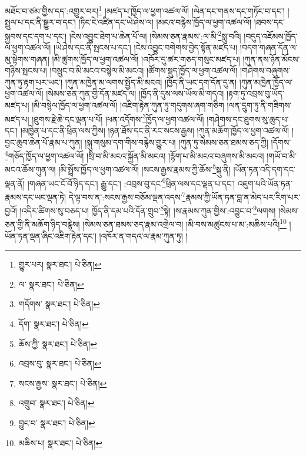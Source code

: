 མཐོང་བ་ཙམ་གྱིས་དད་:འགྱུར་བར།\footnote{གྱུར་པར།  སྣར་ཐང་།  པེ་ཅིན། } །མཛད་པ་ཁྱོད་ལ་ཕྱག་འཚལ་ལོ། །ལེན་དང་གནས་དང་གཏོང་བ་དང་། །སྤྲུལ་པ་དང་ནི་སྒྱུར་བ་དང་། །ཏིང་ངེ་འཛིན་དང་ཡེ་ཤེས་ལ། །མངའ་བརྙེས་ཁྱོད་ལ་ཕྱག་འཚལ་ལོ། །ཐབས་དང་སྐྱབས་དང་དག་པ་དང་། །ངེས་འབྱུང་ཐེག་པ་ཆེན་པོ་ལ། །སེམས་ཅན་རྣམས་:ལ་མི་\footnote{ལ་  སྣར་ཐང་།  པེ་ཅིན། }སླུ་བའི། །བདུད་འཇོམས་ཁྱོད་ལ་ཕྱག་འཚལ་ལོ། །ཡེ་ཤེས་དང་ནི་སྤངས་པ་དང་། །ངེས་འབྱུང་བགེགས་བྱེད་སྟོན་མཛད་པ། །བདག་གཞན་དོན་ལ་མུ་སྟེགས་གཞན། །མི་ཚུགས་ཁྱོད་ལ་ཕྱག་འཚལ་ལོ། །འཁོར་དུ་ཚར་གཅད་གསུང་མཛད་པ། །ཀུན་ནས་ཉོན་མོངས་གཉིས་སྤངས་པ། །བསྲུང་བ་མི་མངའ་བསྙེལ་མི་མངའ། །ཚོགས་སྡུད་ཁྱོད་ལ་ཕྱག་འཚལ་ལོ། །གཤེགས་བཞུགས་ཀུན་ཏུ་རྟག་པར་ཡང་། །ཀུན་མཁྱེན་མ་ལགས་སྤྱོད་མི་མངའ། །ཁྱོད་ནི་ཡང་དག་དོན་དུ་ན། །ཀུན་མཁྱེན་ཁྱོད་ལ་ཕྱག་འཚལ་ལོ། །སེམས་ཅན་ཀུན་གྱི་དོན་མཛད་ལ། །ཁྱོད་ནི་དུས་ལས་ཡོལ་མི་གདའ། །རྟག་ཏུ་འབྲས་བུ་ཡོད་མཛད་པ། །མི་བསྙེལ་ཁྱོད་ལ་ཕྱག་འཚལ་ལོ། །འཇིག་རྟེན་ཀུན་ཏུ་གདུགས་ཞག་གཅིག །ལན་དྲུག་ཏུ་ནི་གཟིགས་མཛད་པ། །ཐུགས་རྗེ་ཆེ་དང་ལྡན་པ་པོ། །ཕན་འདོགས་\footnote{གདོགས་  སྣར་ཐང་།  པེ་ཅིན། }ཁྱོད་ལ་ཕྱག་འཚལ་ལོ། །གཤེགས་དང་ཐུགས་སུ་ཆུད་པ་དང་། །མཁྱེན་པ་དང་ནི་ཕྲིན་ལས་ཀྱིས། །ཉན་ཐོས་དང་ནི་རང་སངས་རྒྱས། །ཀུན་མཆོག་ཁྱོད་ལ་ཕྱག་འཚལ་ལོ། །བྱང་ཆུབ་ཆེན་པོ་རྣམ་པ་ཀུན། །སྐུ་གསུམ་དག་གིས་བརྙེས་གྱུར་པ། །ཀུན་ཏུ་སེམས་ཅན་ཐམས་ཅད་ཀྱི། །དོགས་\footnote{དོག་  སྣར་ཐང་།  པེ་ཅིན། }གཅོད་ཁྱོད་ལ་ཕྱག་འཚལ་ལོ། །སྲི་བ་མི་མངའ་སྐྱོན་མི་མངའ། །རྙོག་པ་མི་མངའ་བཞུགས་མི་མངའ། །གཡོ་བ་མི་མངའ་ཆོས་ཀུན་ལ། །མི་སྤྲོས་ཁྱོད་ལ་ཕྱག་འཚལ་ལོ། །སངས་རྒྱས་རྣམས་ཀྱི་ཆོས་\footnote{ཆོས་ཀྱི་  སྣར་ཐང་།  པེ་ཅིན། }སྐུ་ནི། །ཡོན་ཏན་འདི་དག་དང་ལྡན་ནོ། །གཞན་ཡང་ངོ་བོ་ཉིད་དང་། རྒྱུ་དང་། :འབྲས་བུ་དང་\footnote{འབྲས་བུ་  སྣར་ཐང་།  པེ་ཅིན། }ཕྲིན་ལས་དང་ལྡན་པ་དང་། འཇུག་པའི་ཡོན་ཏན་རྣམས་དང་ཡང་ལྡན་ཏེ། དེ་ལྟ་བས་ན་:སངས་རྒྱས་བཅོམ་ལྡན་འདས་\footnote{སངས་རྒྱས་  སྣར་ཐང་།  པེ་ཅིན། }རྣམས་ཀྱི་ཡོན་ཏན་བླ་ན་མེད་པར་རིག་པར་བྱའོ། །འདིར་ཚིགས་སུ་བཅད་པ། ཁྱོད་ནི་དམ་པའི་དོན་གྲུབ་\footnote{འགྲུབ་  སྣར་ཐང་།  པེ་ཅིན། }སྟེ། །ས་རྣམས་ཀུན་གྱིས་:འབྱུང་བ་\footnote{བྱུང་བ་  སྣར་ཐང་།  པེ་ཅིན། }ལགས། །སེམས་ཅན་གྱི་ནི་མཆོག་ཉིད་བརྙེས། །སེམས་ཅན་ཐམས་ཅད་རྣམ་འགྲེལ་བ། །མི་བས་མཚུངས་པ་མ་:མཆིས་པའི།\footnote{མཆིས་པ།  སྣར་ཐང་།  པེ་ཅིན། } །ཡོན་ཏན་ལྡན་ཞིང་འཇིག་རྟེན་དང་། །འཁོར་ན་གདའ་ལ་རྣམ་ཀུན་ཏུ། །

